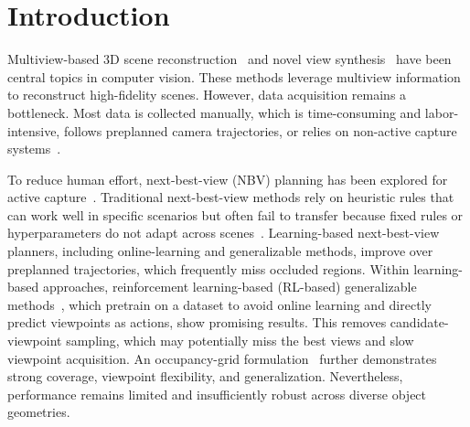 \section{Introduction}
\label{sec:intro}

Multiview-based 3D scene reconstruction~\cite{schoenberger2016sfm, yao2018mvsnet, xie2019pix2vox, murez2020atlas, wang2021multi, sayed2022simplerecon, xu2023unifying, wang2024dust3r, duisterhof2024mast3r, pan2024glomap} and novel view synthesis~\cite{mildenhall2020nerf, yu2021pixelnerf, yu2022plenoxels, mueller2022instant, zheng2024gpsgaussian, gslrm2024, charatan2024pixelsplat, sabour2024spotlesssplats, flynn2024quark, chen2025mvsplat} have been central topics in computer vision. 
These methods leverage multiview information to reconstruct high-fidelity scenes. 
However, data acquisition remains a bottleneck. 
Most data is collected manually, which is time-consuming and labor-intensive, follows preplanned camera trajectories, or relies on non-active capture systems~\cite{xu2023vr, broxton2020immersive, lin2021deep, yoon2020novel, li2022neural, lu2024diva, chen2024x360}.

To reduce human effort, next-best-view (NBV) planning has been explored for active capture~\cite{monica2018contour, zha1997next, liu2018object, hardouin2020surface, hardouin2020next, lin2022active, pan2022activenerf, lee2022uncertainty, zhan2022activermap, jin2023neu, sunderhauf2023density, ran2023neurar, guedon2023macarons, jiang2023fisherrf}. 
Traditional next-best-view methods rely on heuristic rules that can work well in specific scenarios but often fail to transfer because fixed rules or hyperparameters do not adapt across scenes~\cite{chen2024gennbv}. 
Learning-based next-best-view planners, including online-learning and generalizable methods, improve over preplanned trajectories, which frequently miss occluded regions.
Within learning-based approaches, reinforcement learning-based (RL-based) generalizable methods~\cite{peralta2020next, chen2024gennbv}, which pretrain on a dataset to avoid online learning and directly predict viewpoints as actions, show promising results.
This removes candidate-viewpoint sampling, which may potentially miss the best views and slow viewpoint acquisition. 
An occupancy-grid formulation~\cite{chen2024gennbv} further demonstrates strong coverage, viewpoint flexibility, and generalization. 
Nevertheless, performance remains limited and insufficiently robust across diverse object geometries.

